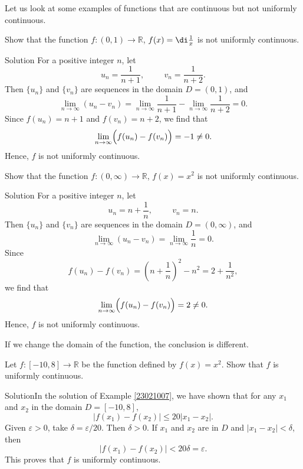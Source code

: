 \begin{example}
Let us look at some examples of functions that are continuous but not uniformly continuous.
\begin{example}{}
Show that the function $f:(0,1)\rightarrow\mathbb{R}$, $f(x)=\di\frac{1}{x}$ is not uniformly continuous. 
\end{example}
\begin{solution}{Solution}
For a positive integer $n$, let
\[u_n=\frac{1}{n+1},\hspace{1cm}v_n=\frac{1}{n+2}.\]
Then $\{u_n\}$ and $\{v_n\}$ are sequences in the domain $D=(0,1)$, and
\[\lim_{n\rightarrow\infty}(u_n-v_n)=\lim_{n\to\infty}\frac{1}{n+1}-\lim_{n\to\infty}\frac{1}{n+2}=0.\]\bs
Since $f(u_n)=n+1$ and $f(v_n)=n+2$, we find that
\[\lim_{n\rightarrow\infty}\Bigl(f(u_n)-f(v_n)\Bigr)=-1\neq 0.\]Hence, $f$ is not uniformly continuous.
\end{solution}

\begin{example}{}
Show that the function $f:(0,\infty)\rightarrow\mathbb{R}$, $f(x)=x^2$ is not uniformly continuous. 
\end{example}
\begin{solution}{Solution}
For a positive integer $n$, let
\[u_n=n+\frac{1}{n},\hspace{1cm}v_n=n.\]
Then $\{u_n\}$ and $\{v_n\}$ are sequences in the domain $D=(0,\infty)$, and
\[\lim_{n\rightarrow\infty}(u_n-v_n)=\lim_{n\rightarrow\infty}\frac{1}{n}=0.\] 
Since 
\[f(u_n)-f(v_n)=\left(n+\frac{1}{n}\right)^2-n^2=2+\frac{1}{n^2},\]we find that
\[\lim_{n\rightarrow\infty}\Bigl(f(u_n)-f(v_n)\Bigr)=2\neq 0.\]Hence, $f$ is not uniformly continuous.
\end{solution}

If we change the domain of the function, the conclusion is different.
\begin{example}[label=e23021008]{}
Let $f:[-10, 8]\rightarrow \mathbb{R}$ be the function defined by $f(x)=x^2$. Show that $f$ is uniformly continuous.
\end{example}
\begin{solution}{Solution}In the solution of Example \ref{23021007}, we have shown that
for any $x_1$ and $x_2$ in the domain $D=[-10, 8]$, 
\[|f(x_1)-f(x_2)|\leq 20|x_1-x_2|.\]
Given $\varepsilon>0$, take $\delta=\varepsilon/20$. Then $\delta>0$. If $x_1$ and $x_2$ are in $D$ and $|x_1-x_2|<\delta$, then
\[|f(x_1)-f(x_2)|<20\delta=\varepsilon.\]This proves that $f$ is uniformly continuous.
\end{solution}



\end{example}

